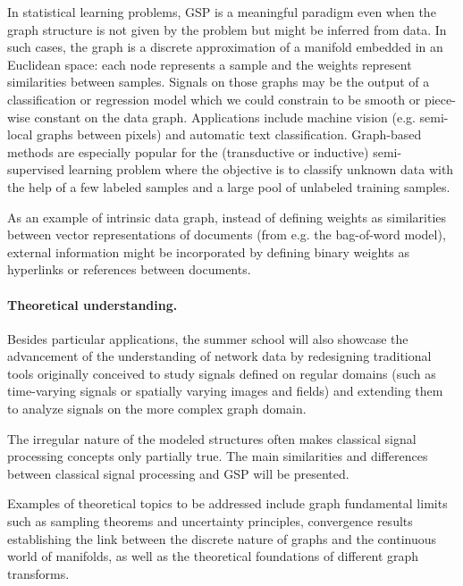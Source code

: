 \documentclass[a4paper]{scrartcl}
\begin{document}

In statistical learning problems, GSP is a meaningful paradigm even when the
graph structure is not given by the problem but might be inferred from data.  In
such cases, the graph is a discrete approximation of a manifold embedded in an
Euclidean space: each node represents a sample and the weights represent
similarities between samples. Signals on those graphs may be the output of a
classification or regression model which we could constrain to be smooth or
piece-wise constant on the data graph. Applications include machine vision (e.g.
semi-local graphs between pixels) and automatic text classification.
Graph-based methods are especially popular for the (transductive or inductive)
semi-supervised learning problem where the objective is to classify unknown data
with the help of a few labeled samples and a large pool of unlabeled training
samples.

As an example of intrinsic data graph, instead of defining weights as
similarities between vector representations of documents (from e.g. the
bag-of-word model), external information might be incorporated by defining
binary weights as hyperlinks or references between documents.

\paragraph{Theoretical understanding.}
Besides particular applications, the summer school will also showcase the
advancement of the understanding of network data by redesigning traditional
tools originally conceived to study signals defined on regular domains (such as
time-varying signals or spatially varying images and fields) and extending them
to analyze signals on the more complex graph domain.

The irregular nature of the modeled structures often makes classical signal
processing concepts only partially true. The main similarities and differences
between classical signal processing and GSP will be presented.

Examples of theoretical topics to be addressed include graph fundamental limits
such as sampling theorems and uncertainty principles, convergence results
establishing the link between the discrete nature of graphs and the continuous
world of manifolds, as well as the theoretical foundations of different graph
transforms.
\end{document}
